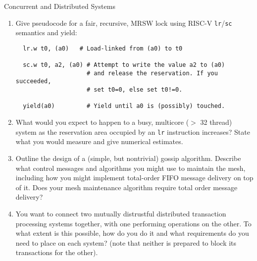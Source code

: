 \documentclass{tripos}
\begin{document}
\begin{question}[MockIA,year=2025,paper=2,question=3,author=nobody]{Concurrent and Distributed Systems}

\begin{enumerate}
\item Give pseudocode for a fair, recursive, MRSW lock using RISC-V \verb|lr|/\verb|sc| semantics and yield:

\begin{verbatim}
  lr.w t0, (a0)   # Load-linked from (a0) to t0

  sc.w t0, a2, (a0) # Attempt to write the value a2 to (a0)
                    # and release the reservation. If you succeeded,
                    # set t0=0, else set t0!=0.

  yield(a0)         # Yield until a0 is (possibly) touched.

\end{verbatim}

\item What would you expect to happen to a busy, multicore ($>$ 32
  thread) system as the reservation area occupied by an \verb|lr|
  instruction increases? State what you would measure and give
  numerical estimates.  

\item Outline the design of a (simple, but nontrivial) gossip algorithm. Describe what control messages and algorithms you might use to maintain the mesh, including how you might implement total-order FIFO message delivery on top of it. Does your mesh maintenance algorithm require total order message delivery? 

\item You want to connect two mutually distrustful distributed transaction processing systems together, with one performing operations on the other. To what extent is this possible, how do you do it and what requirements do you need to place on each system? (note that neither is prepared to block its transactions for the other). 

 \end{enumerate}
\end{question}
\end{document}

